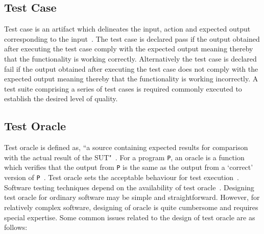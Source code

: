 \subsection{Test Case}
Test case is an artifact which delineates the input, action and expected output corresponding to the input~\cite{ahmed2010software}. The test case is declared pass if the output obtained after executing the test case comply with the expected output meaning thereby that the functionality is working correctly. Alternatively the test case is declared fail if the output obtained after executing the test case does not comply with the expected output meaning thereby that the functionality is working incorrectly. %
A test suite comprising a series of test cases is required commonly executed to establish the desired level of quality.


\subsection{Test Oracle}
Test oracle is defined as, ``a source containing expected results for comparison with the actual result of the SUT"~\cite{ahmed2010software}. For a program \verb+P+, an oracle is a function which verifies that the output from \verb+P+ is the same as the output from a ‘correct’ version of \verb+P+~\cite{howden1986functional}. Test oracle sets the acceptable behaviour for test execution~\cite{baresi2001test}. Software testing techniques depend on the availability of test oracle~\cite{gaudel2010software}. Designing test oracle for ordinary software may be simple and straightforward. However, for relatively complex software, designing of oracle is quite cumbersome and requires special expertise. 
Some common issues related to the design of test oracle are as follows:

